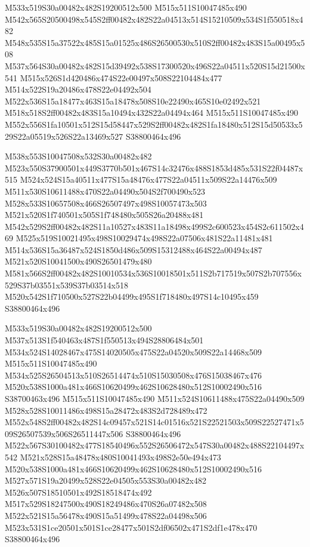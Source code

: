 \documentclass{article}
\begin{document}
\begin{multicols}{2}
M533x519S30a00482x482S19200512x500 M515x511S10047485x490 M542x565S20500498x545S2ff00482x482S22a04513x514S15210509x534S1f550518x482 M548x535S15a37522x485S15a01525x486S26500530x510S2ff00482x483S15a00495x508 M537x564S30a00482x482S15d39492x538S17300520x496S22a04511x520S15d21500x541 M515x526S1d420486x474S22e00497x508S22104484x477 M514x522S19a20486x478S22e04492x504 M522x536S15a18477x463S15a18478x508S10e22490x465S10e02492x521 M518x518S2ff00482x483S15a10494x432S22a04494x464 M515x511S10047485x490 M552x556S1fa10501x512S15d58447x529S2ff00482x482S1fa18480x512S15d50533x529S22a05519x526S22a13469x527 S38800464x496

M538x553S10047508x532S30a00482x482 M523x550S37900501x449S3770b501x467S14c32476x488S1853d485x531S22f04487x515 M524x524S15a40511x477S15a48476x477S22a04511x509S22a14476x509 M511x530S10611488x470S22a04490x504S2f700490x523 M528x533S10657508x466S26507497x498S10057473x503 M521x520S1f740501x505S1f748480x505S26a20488x481 M542x529S2ff00482x482S11a10527x483S11a18498x499S2c600523x454S2c611502x469 M525x519S10021495x498S10029474x498S22a07506x481S22a11481x481 M514x536S15a36487x524S1850d486x509S15312488x464S22a00494x487 M521x520S10041500x490S26501479x480 M581x566S2ff00482x482S10010534x536S10018501x511S2b717519x507S2b707556x529S37b03551x539S37b03514x518 M520x542S1f710500x527S22b04499x495S1f718480x497S14c10495x459 S38800464x496

M533x519S30a00482x482S19200512x500 M537x513S1f540463x487S1f550513x494S28806484x501 M534x524S14028467x475S14020505x475S22a04520x509S22a14468x509 M515x511S10047485x490 M534x525S26504513x510S26514474x510S15030508x476S15038467x476 M520x538S1000a481x466S10620499x462S10628480x512S10002490x516 S38700463x496 M515x511S10047485x490 M511x524S10611488x475S22a04490x509 M528x528S10011486x498S15a28472x483S2d728489x472 M552x548S2ff00482x482S14c09457x521S14c01516x521S22521503x509S22527471x509S26507539x506S26511447x506 S38800464x496 M522x567S30100482x477S18540496x552S26506472x547S30a00482x488S22104497x542 M521x528S15a48478x480S10041493x498S2e50e494x473 M520x538S1000a481x466S10620499x462S10628480x512S10002490x516 M527x571S19a20499x528S22e04505x553S30a00482x482 M526x507S18510501x492S18518474x492 M517x529S18247500x490S18249486x470S26a07482x508 M522x521S15a56478x490S15a51499x478S22a04498x506 M523x531S1ce20501x501S1ce28477x501S2df06502x471S2df1e478x470 S38800464x496


\end{multicols}
\end{document}
